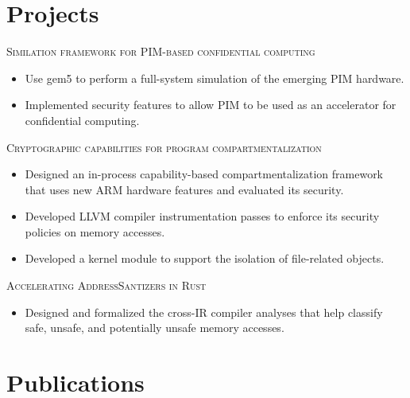 \documentclass[a4paper,12pt]{article}
\begin{document}
\section{Projects}

\textsc{Similation framework for PIM-based confidential computing}
\begin{itemize}[nosep,after=\strut, leftmargin=2em, itemsep=3pt]
	\item Use gem5 to perform a full-system simulation of the emerging PIM hardware.
	\item Implemented security features to allow PIM to be used as an accelerator for confidential computing.
\end{itemize}

\textsc{Cryptographic capabilities for program compartmentalization}
\begin{itemize}[nosep,after=\strut, leftmargin=2em, itemsep=3pt]
	\item Designed an in-process capability-based compartmentalization framework that uses new ARM hardware features and evaluated its security.
	\item Developed LLVM compiler instrumentation passes to enforce its security policies on memory accesses.
	\item Developed a kernel module to support the isolation of file-related objects.
\end{itemize}

\textsc{Accelerating AddressSantizers in Rust}
\begin{itemize}[nosep,after=\strut, leftmargin=2em, itemsep=3pt]
	\item Designed and formalized the cross-IR compiler analyses that help classify safe, unsafe, and potentially unsafe memory accesses.
\end{itemize}






\newpage
\section{Publications}
\begin{refsection}
	\nocite{*}
	\printbibliography[heading=none]
\end{refsection}
\vfill
{}
\end{document}
